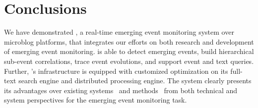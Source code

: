 
\section{Conclusions}
We have demonstrated \ring, a real-time emerging event monitoring system over microblog platforms,
that integrates our efforts on both research and development of emerging event monitoring.
\ring is able to detect emerging events, build hierarchical sub-event correlations, trace event evolutions, and support event and text queries.
Further, \ring's infrastructure is equipped with customized optimization on its full-text search engine and distributed processing engine.
The system clearly presents its advantages over existing systems~\cite{mathioudakis2010twittermonitor,xie2014clear, schubert2014signitrend} and methods~\cite{weng2011event, sayyadi2013toit, yan2013biterm} from both technical and system perspectives for the emerging event monitoring task.



\balance

